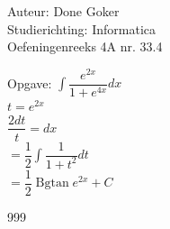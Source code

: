 \documentclass[a4paper]{article}
\begin{document}
  
\noindent \large Auteur: Done Goker \\
\noindent \large Studierichting: Informatica\\
\noindent \large Oefeningenreeks 4A nr. 33.4\\

\medskip

\normalsize

Opgave:
$\displaystyle\int \dfrac{e^{2x}}{1+e^{4x}} dx$ \\

$t = e^{2x}$ \\

$ \dfrac{2dt}{t}  = dx$ \\

$= \dfrac{1}{2}\displaystyle\int \dfrac{1}{{1+t^{2}}}dt $ \\

$=\dfrac{1}{2} \operatorname{Bgtan} e^{2x} + C$




\begin{thebibliography}{999}
\end{thebibliography}
\end{document}

